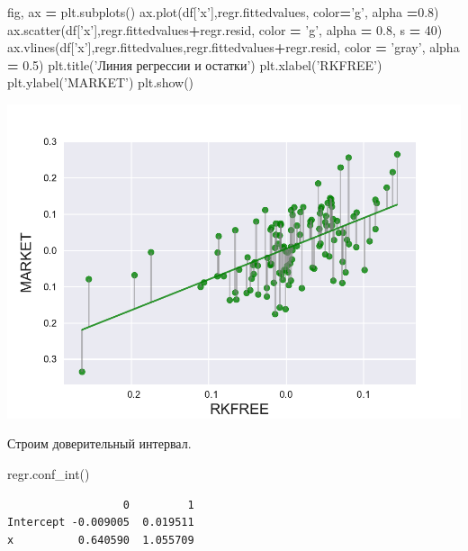 \documentclass[]{book}
\newenvironment{Shaded}{\begin{snugshade}}{\end{snugshade}}
\newcommand{\DecValTok}[1]{\textcolor[rgb]{0.00,0.00,0.81}{#1}}
\newcommand{\FloatTok}[1]{\textcolor[rgb]{0.00,0.00,0.81}{#1}}
\newcommand{\NormalTok}[1]{#1}
\newcommand{\OperatorTok}[1]{\textcolor[rgb]{0.81,0.36,0.00}{\textbf{#1}}}
\newcommand{\StringTok}[1]{\textcolor[rgb]{0.31,0.60,0.02}{#1}}
\begin{document}
\begin{Shaded}
\begin{Highlighting}[]
\NormalTok{fig, ax }\OperatorTok{=}\NormalTok{ plt.subplots()}
\NormalTok{ax.plot(df[}\StringTok{'x'}\NormalTok{],regr.fittedvalues, color}\OperatorTok{=}\StringTok{'g'}\NormalTok{, alpha }\OperatorTok{=}\FloatTok{0.8}\NormalTok{)}
\NormalTok{ax.scatter(df[}\StringTok{'x'}\NormalTok{],regr.fittedvalues}\OperatorTok{+}\NormalTok{regr.resid, color }\OperatorTok{=} \StringTok{'g'}\NormalTok{, alpha }\OperatorTok{=} \FloatTok{0.8}\NormalTok{, s }\OperatorTok{=} \DecValTok{40}\NormalTok{)}
\NormalTok{ax.vlines(df[}\StringTok{'x'}\NormalTok{],regr.fittedvalues,regr.fittedvalues}\OperatorTok{+}\NormalTok{regr.resid, color }\OperatorTok{=} \StringTok{'gray'}\NormalTok{, alpha }\OperatorTok{=} \FloatTok{0.5}\NormalTok{)}
\NormalTok{plt.title(}\StringTok{'Линия регрессии и остатки'}\NormalTok{)}
\NormalTok{plt.xlabel(}\StringTok{'RKFREE'}\NormalTok{)}
\NormalTok{plt.ylabel(}\StringTok{'MARKET'}\NormalTok{)}
\NormalTok{plt.show()}
\end{Highlighting}
\end{Shaded}

\includegraphics{02-simplereg_files/figure-latex/unnamed-chunk-13-1.pdf}

Строим доверительный интервал.

\begin{Shaded}
\begin{Highlighting}[]
\NormalTok{regr.conf_int()}
\end{Highlighting}
\end{Shaded}

\begin{verbatim}
                  0         1
Intercept -0.009005  0.019511
x          0.640590  1.055709
\end{verbatim}
\end{document}
